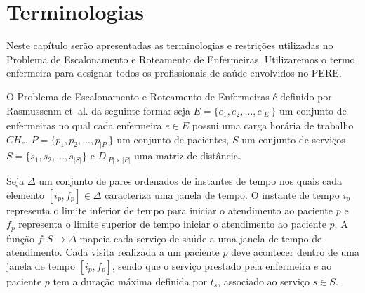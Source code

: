 \section{\esp Terminologias}\label{terminologia}

Neste capítulo serão apresentadas as terminologias e restrições utilizadas no Problema de Escalonamento e Roteamento de Enfermeiras. Utilizaremos o termo enfermeira para designar todos os profissionais de saúde envolvidos no \ac{PERE}. 

O Problema de Escalonamento e Roteamento de Enfermeiras é definido por Rasmussenm et~al. da seguinte forma: seja $E = \{ e_1, e_2, \ldots, e_{|E|} \}$ um conjunto de enfermeiras no qual cada enfermeira $e\in E$ possui uma carga horária de trabalho $CH_e$, $P = \{p_1, p_2, \ldots, p_{|P|} \}$ um conjunto de pacientes, $S$ um conjunto de serviços $S = \{ s_1, s_2, \ldots, s_{|S|} \}$ e $D_{|P|\times |P|}$ uma matriz de distância. 

Seja $\Delta$ um conjunto de pares ordenados de instantes de tempo nos quais cada elemento $[i_p, f_p] \in \Delta$ caracteriza uma janela de tempo. O instante de tempo $i_{p}$ representa o limite inferior de tempo para iniciar o atendimento ao paciente $p$ e $f_{p}$ representa o limite superior de tempo iniciar o atendimento ao paciente $p$. A função $f: S \rightarrow \Delta$ mapeia cada serviço de saúde a uma janela de tempo de atendimento. Cada visita realizada a um paciente $p$ deve acontecer dentro de uma janela de tempo $[i_{p},f_{p}]$, sendo que o serviço prestado pela enfermeira $e$ ao paciente $p$ tem a duração máxima definida por $t_s$, associado ao serviço $s \in S$.